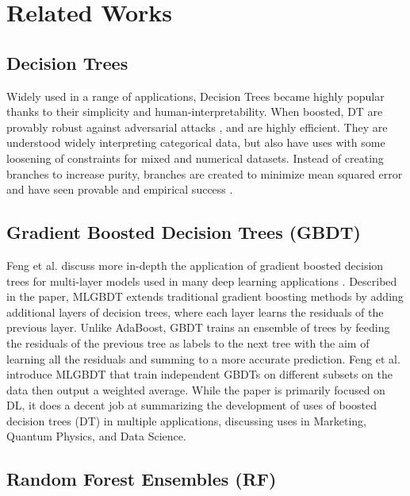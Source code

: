 \documentclass{article}
\begin{document}
\section{Related Works}
\label{gen_inst}

\subsection{Decision Trees}

Widely used in a range of applications, Decision Trees became highly popular thanks to their simplicity and human-interpretability. When boosted, DT are provably robust against adversarial attacks \cite{Maksym}, and are highly efficient. They are understood widely interpreting categorical data, but also have uses with some loosening of constraints for mixed and numerical datasets. Instead of creating branches to increase purity, branches are created to minimize mean squared error and have seen provable and empirical success \cite{Luo}.

\subsection{Gradient Boosted Decision Trees (GBDT)}

Feng et al. discuss more in-depth the application of gradient boosted decision trees for multi-layer models used in many deep learning applications \cite{Feng}. Described in the paper, MLGBDT extends traditional gradient boosting methods by adding additional layers of decision trees, where each layer learns the residuals of the previous layer. Unlike AdaBoost, GBDT trains an ensemble of trees by feeding the residuals of the previous tree as labels to the next tree with the aim of learning all the residuals and summing to a more accurate prediction. Feng et al. introduce MLGBDT that train independent GBDTs on different subsets on the data then output a weighted average. While the paper is primarily focused on DL, it does a decent job at summarizing the development of uses of boosted decision trees (DT) in multiple applications, discussing uses in Marketing, Quantum Physics, and Data Science. 

\subsection{Random Forest Ensembles (RF)}
\end{document}
